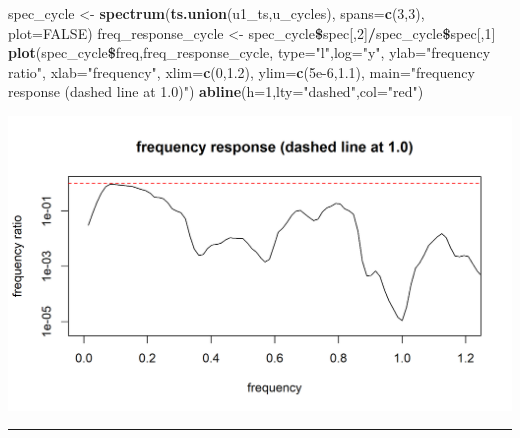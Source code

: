 \documentclass[]{article}
\newenvironment{Shaded}{\begin{snugshade}}{\end{snugshade}}
\newcommand{\KeywordTok}[1]{\textcolor[rgb]{0.13,0.29,0.53}{\textbf{#1}}}
\newcommand{\DataTypeTok}[1]{\textcolor[rgb]{0.13,0.29,0.53}{#1}}
\newcommand{\DecValTok}[1]{\textcolor[rgb]{0.00,0.00,0.81}{#1}}
\newcommand{\FloatTok}[1]{\textcolor[rgb]{0.00,0.00,0.81}{#1}}
\newcommand{\StringTok}[1]{\textcolor[rgb]{0.31,0.60,0.02}{#1}}
\newcommand{\OtherTok}[1]{\textcolor[rgb]{0.56,0.35,0.01}{#1}}
\newcommand{\OperatorTok}[1]{\textcolor[rgb]{0.81,0.36,0.00}{\textbf{#1}}}
\newcommand{\NormalTok}[1]{#1}
\begin{document}
\begin{Shaded}
\begin{Highlighting}[]
\NormalTok{spec_cycle <-}\StringTok{ }\KeywordTok{spectrum}\NormalTok{(}\KeywordTok{ts.union}\NormalTok{(u1_ts,u_cycles),}
  \DataTypeTok{spans=}\KeywordTok{c}\NormalTok{(}\DecValTok{3}\NormalTok{,}\DecValTok{3}\NormalTok{),}
  \DataTypeTok{plot=}\OtherTok{FALSE}\NormalTok{)}
\NormalTok{freq_response_cycle <-}\StringTok{ }\NormalTok{spec_cycle}\OperatorTok{\$}\NormalTok{spec[,}\DecValTok{2}\NormalTok{]}\OperatorTok{/}\NormalTok{spec_cycle}\OperatorTok{\$}\NormalTok{spec[,}\DecValTok{1}\NormalTok{]}
\KeywordTok{plot}\NormalTok{(spec_cycle}\OperatorTok{\$}\NormalTok{freq,freq_response_cycle,}
  \DataTypeTok{type=}\StringTok{"l"}\NormalTok{,}\DataTypeTok{log=}\StringTok{"y"}\NormalTok{,}
  \DataTypeTok{ylab=}\StringTok{"frequency ratio"}\NormalTok{, }\DataTypeTok{xlab=}\StringTok{"frequency"}\NormalTok{, }\DataTypeTok{xlim=}\KeywordTok{c}\NormalTok{(}\DecValTok{0}\NormalTok{,}\FloatTok{1.2}\NormalTok{), }\DataTypeTok{ylim=}\KeywordTok{c}\NormalTok{(}\FloatTok{5e-6}\NormalTok{,}\FloatTok{1.1}\NormalTok{),}
  \DataTypeTok{main=}\StringTok{"frequency response (dashed line at 1.0)"}\NormalTok{)}
\KeywordTok{abline}\NormalTok{(}\DataTypeTok{h=}\DecValTok{1}\NormalTok{,}\DataTypeTok{lty=}\StringTok{"dashed"}\NormalTok{,}\DataTypeTok{col=}\StringTok{"red"}\NormalTok{)  }
\end{Highlighting}
\end{Shaded}

\begin{center}\includegraphics{figure/intro-freq_response-1} \end{center}

\begin{center}\rule{0.5\linewidth}{\linethickness}\end{center}
\end{document}
